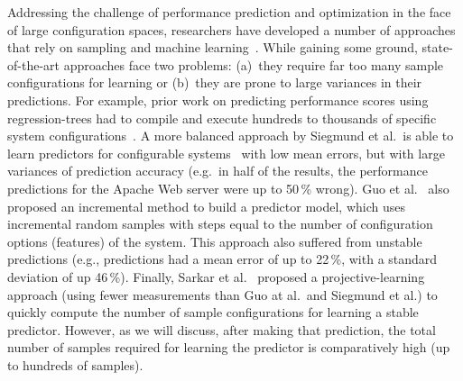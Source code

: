 \documentclass{newsig}
\begin{document}
Addressing the challenge of performance prediction and optimization in the face of large configuration spaces, researchers have developed a number of approaches that rely on sampling and machine learning~\cite{siegmund2012predicting,guo2013variability,sarkar2015cost}.
While gaining some ground, state-of-the-art approaches face two problems: 
(a)~they require far too many sample configurations for learning or (b)~they are prone to large variances in their predictions. For example, prior work on predicting performance scores using regression-trees had to compile and execute hundreds to thousands of specific system configurations~\cite{guo2013variability}. 
A more balanced approach by Siegmund et al.\ is able to learn predictors for  configurable systems~\cite{siegmund2012predicting} with low mean errors, but with large variances of prediction accuracy  (e.g.\ in half of the results, the performance predictions for the Apache Web server were up to 50\,\% wrong). 
Guo et al.~\cite{guo2013variability} also proposed an incremental method to build a predictor model, which uses incremental random samples with steps equal to the number of configuration options (features) of the system. This approach also
suffered from  unstable predictions (e.g., predictions had a mean error of up to 22\,\%, with a standard deviation of up 46\,\%). Finally, Sarkar et al.~\cite{sarkar2015cost} proposed a proj\-ective-learning approach (using fewer measurements than Guo at al.\ and Siegmund et al.) to quickly compute  the number of sample configurations for learning a stable predictor. However, as we will discuss, after making that prediction, the total number of samples required for learning the predictor is comparatively high (up to hundreds of samples).
\end{document}
